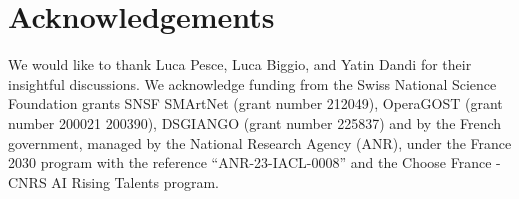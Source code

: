 \section*{Acknowledgements}

We would like to thank Luca Pesce, Luca Biggio, and Yatin Dandi for their insightful discussions. We acknowledge funding from the Swiss National Science Foundation grants SNSF SMArtNet (grant number 212049), OperaGOST (grant number 200021 200390), DSGIANGO (grant number 225837) and by the French government, managed by the National Research Agency (ANR), under the France 2030 program with the reference ``ANR-23-IACL-0008'' and the Choose France - CNRS AI Rising Talents program.

